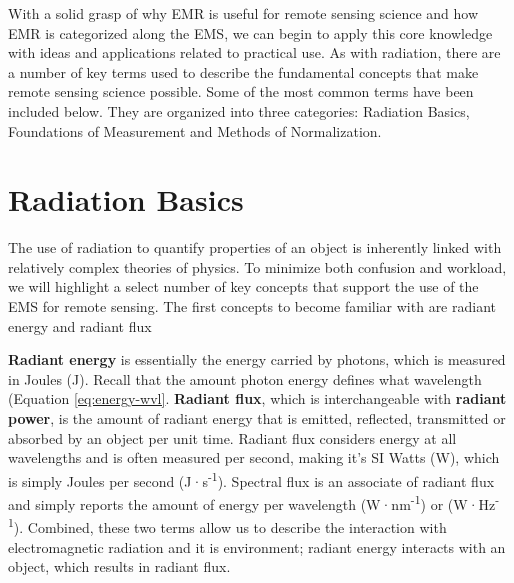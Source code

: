 \documentclass[
]{book}
\begin{document}
With a solid grasp of why EMR is useful for remote sensing science and how EMR is categorized along the EMS, we can begin to apply this core knowledge with ideas and applications related to practical use. As with radiation, there are a number of key terms used to describe the fundamental concepts that make remote sensing science possible. Some of the most common terms have been included below. They are organized into three categories: Radiation Basics, Foundations of Measurement and Methods of Normalization.

\section{Radiation Basics}\label{radiation-basics}

The use of radiation to quantify properties of an object is inherently linked with relatively complex theories of physics. To minimize both confusion and workload, we will highlight a select number of key concepts that support the use of the EMS for remote sensing. The first concepts to become familiar with are radiant energy and radiant flux

\textbf{Radiant energy} is essentially the energy carried by photons, which is measured in Joules (J). Recall that the amount photon energy defines what wavelength (Equation \eqref{eq:energy-wvl}. \textbf{Radiant flux}, which is interchangeable with \textbf{radiant power}, is the amount of radiant energy that is emitted, reflected, transmitted or absorbed by an object per unit time. Radiant flux considers energy at all wavelengths and is often measured per second, making it's SI Watts (W), which is simply Joules per second (J·s\textsuperscript{-1}). Spectral flux is an associate of radiant flux and simply reports the amount of energy per wavelength (W·nm\textsuperscript{-1}) or (W·Hz\textsuperscript{-1}). Combined, these two terms allow us to describe the interaction with electromagnetic radiation and it is environment; radiant energy interacts with an object, which results in radiant flux.
\end{document}
